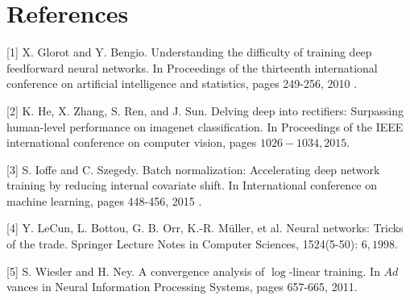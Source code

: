 \documentclass[10pt]{article}
\begin{document}
\section{References}
[1] X. Glorot and Y. Bengio. Understanding the difficulty of training deep feedforward neural networks. In Proceedings of the thirteenth international conference on artificial intelligence and statistics, pages 249-256, 2010 .

[2] K. He, X. Zhang, S. Ren, and J. Sun. Delving deep into rectifiers: Surpassing human-level performance on imagenet classification. In Proceedings of the IEEE international conference on computer vision, pages $1026-1034,2015 .$

[3] S. Ioffe and C. Szegedy. Batch normalization: Accelerating deep network training by reducing internal covariate shift. In International conference on machine learning, pages 448-456, 2015 .

[4] Y. LeCun, L. Bottou, G. B. Orr, K.-R. Müller, et al. Neural networks: Tricks of the trade. Springer Lecture Notes in Computer Sciences, 1524(5-50): $6,1998 .$

[5] S. Wiesler and H. Ney. A convergence analysis of $\log$-linear training. In $A d$ vances in Neural Information Processing Systems, pages 657-665, 2011.
\end{document}
